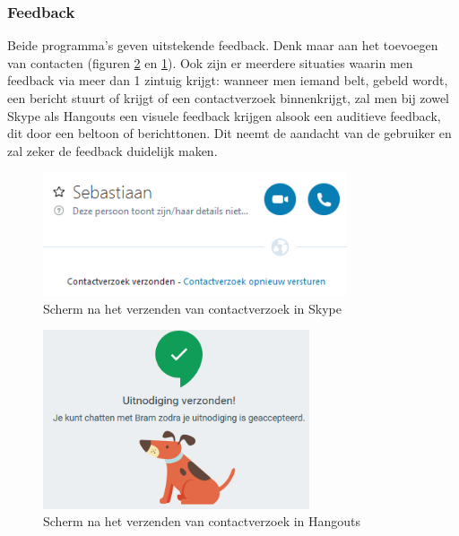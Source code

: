 \documentclass[11pt]{article}
\begin{document}
\subsubsection{Feedback}
Beide programma's geven uitstekende feedback. Denk maar aan het toevoegen van contacten (figuren \ref{fig:HContact} en \ref{fig:SContact}). Ook zijn er meerdere situaties waarin men feedback via meer dan 1 zintuig krijgt: wanneer men iemand belt, gebeld wordt, een bericht stuurt of krijgt of een contactverzoek binnenkrijgt, zal men bij zowel Skype als Hangouts een visuele feedback krijgen alsook een auditieve feedback, dit door een beltoon of berichttonen. Dit neemt de aandacht van de gebruiker en zal zeker de feedback duidelijk maken.
\begin{figure}
	\centering
	\includegraphics[width=0.8\textwidth]{Niels_SkUitnodiging.png}
	\caption{Scherm na het verzenden van contactverzoek in Skype}
	\label{fig:SContact}
\end{figure}
\newpage
\begin{figure}
	\centering
	\includegraphics[width=0.7\textwidth]{Niels_Uitnodiging.png}
	\caption{Scherm na het verzenden van contactverzoek in Hangouts}
	\label{fig:HContact}
\end{figure}
\end{document}
